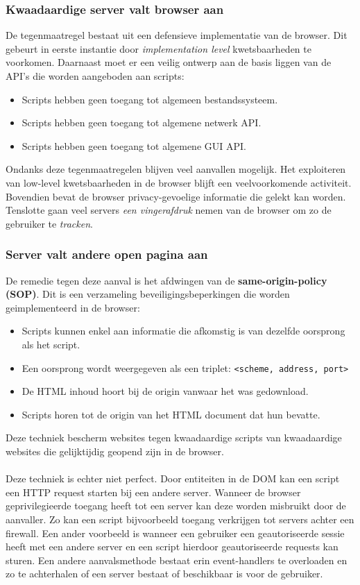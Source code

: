 \documentclass[../main.tex]{subfiles}
\begin{document}
\subsubsection{Kwaadaardige server valt browser aan}
De tegenmaatregel bestaat uit een defensieve implementatie van de browser. Dit gebeurt in eerste instantie door \textit{implementation level} kwetsbaarheden te voorkomen. Daarnaast moet er een veilig ontwerp aan de basis liggen van de API's die worden aangeboden aan scripts:
\begin{itemize}
	\item Scripts hebben geen toegang tot algemeen bestandssysteem.
	\item Scripts hebben geen toegang tot algemene netwerk API.
	\item Scripts hebben geen toegang tot algemene GUI API.
\end{itemize}
Ondanks deze tegenmaatregelen blijven veel aanvallen mogelijk. Het exploiteren van low-level kwetsbaarheden in de browser blijft een veelvoorkomende activiteit. Bovendien bevat de browser privacy-gevoelige informatie die gelekt kan worden. Tenslotte gaan veel servers \textit{een vingerafdruk} nemen van de browser om zo de gebruiker te \textit{tracken}.

\subsubsection{Server valt andere open pagina aan}
De remedie tegen deze aanval is het afdwingen van de \textbf{same-origin-policy (SOP)}. Dit is een verzameling beveiligingsbeperkingen die worden geimplementeerd in de browser:
\begin{itemize}
	\item Scripts kunnen enkel aan informatie die afkomstig is van dezelfde oorsprong als het script. 
	\item Een oorsprong wordt weergegeven als een triplet:  \texttt{<scheme, address, port>}
	\item De HTML inhoud hoort bij de origin vanwaar het was gedownload.
	\item Scripts horen tot de origin van het HTML document dat hun bevatte.
\end{itemize} 
Deze techniek bescherm websites tegen kwaadaardige scripts van kwaadaardige websites die gelijktijdig geopend zijn in de browser. 
\\\\
Deze techniek is echter niet perfect. Door entiteiten in de DOM kan een script een HTTP request starten bij een andere server. Wanneer de browser geprivilegieerde toegang heeft tot een server kan deze worden misbruikt door de aanvaller. Zo kan een script bijvoorbeeld toegang verkrijgen tot servers achter een firewall. Een ander voorbeeld is wanneer een gebruiker een geautoriseerde sessie heeft met een andere server en een script hierdoor geautoriseerde requests kan sturen. Een andere aanvalsmethode bestaat erin event-handlers te overloaden en zo te achterhalen of een server bestaat of beschikbaar is voor de gebruiker.
\end{document}

